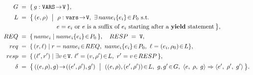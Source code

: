 
\[
\begin{aligned}
	G \;&=\; \{\, g : \texttt{VARS}\!\to\! \texttt{V} \,\},\\[0.3ex]
	L \;&=\; \bigl\{\, (e,\rho)\ \bigm|\ \rho:\texttt{vars}\!\to\! \texttt{V},\ \exists\,name_i\{e_i\}\!\in\! P_0\ \text{s.t.} \\[-0.2ex]
	&\qquad\quad\qquad\quad e=e_i \text{ or } e \text{ is a suffix of } e_i \text{ starting after a } \yieldkw \text{ statement}\,\bigr\},\\[0.3ex]
	REQ \;&=\; \{\, name_i \mid name_i\{e_i\}\!\in\! P_0 \,\},\quad RESP \;=\; \texttt{V},\\[0.3ex]
	req \;&=\; \{\, (r,\ell) \mid r=name_i\!\in\!REQ,\ name_i\{e_i\}\!\in\! P_0,\ \ell=(e_i,\rho_0)\!\in\!L\},\\[0.3ex]
	resp \;&=\; \{\, (\ell',r') \mid \exists v\!\in\!\texttt{V}.\ \ell'=(v,\rho')\!\in\!L,\ r'=v\!\in\!RESP \,\},\\[0.3ex]
	\delta \;&=\; \bigl\{\, ((e,\rho),g)\!\to\!((e',\rho'),g') \ \bigm|\ ((e,\rho),(e',\rho'))\!\in\!L,\ g,g'\!\in\!G,\ 
	\cfg{e}{\rho}{g} \pstep \cfg{e'}{\rho'}{g'} \,\bigr\}.
\end{aligned}
\]


